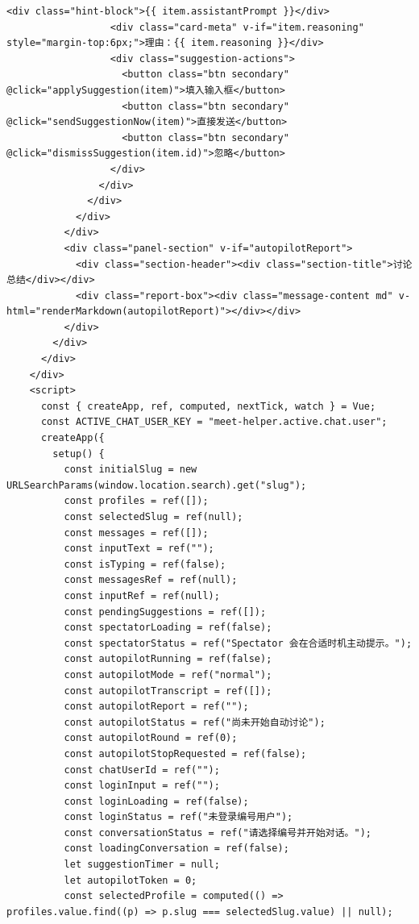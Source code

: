 \documentclass[12pt,a4paper]{article}
\begin{document}
\begin{Verbatim}[fontsize=\footnotesize]
                  <div class="hint-block">{{ item.assistantPrompt }}</div>
                  <div class="card-meta" v-if="item.reasoning" style="margin-top:6px;">理由：{{ item.reasoning }}</div>
                  <div class="suggestion-actions">
                    <button class="btn secondary" @click="applySuggestion(item)">填入输入框</button>
                    <button class="btn secondary" @click="sendSuggestionNow(item)">直接发送</button>
                    <button class="btn secondary" @click="dismissSuggestion(item.id)">忽略</button>
                  </div>
                </div>
              </div>
            </div>
          </div>
          <div class="panel-section" v-if="autopilotReport">
            <div class="section-header"><div class="section-title">讨论总结</div></div>
            <div class="report-box"><div class="message-content md" v-html="renderMarkdown(autopilotReport)"></div></div>
          </div>
        </div>
      </div>
    </div>
    <script>
      const { createApp, ref, computed, nextTick, watch } = Vue;
      const ACTIVE_CHAT_USER_KEY = "meet-helper.active.chat.user";
      createApp({
        setup() {
          const initialSlug = new URLSearchParams(window.location.search).get("slug");
          const profiles = ref([]);
          const selectedSlug = ref(null);
          const messages = ref([]);
          const inputText = ref("");
          const isTyping = ref(false);
          const messagesRef = ref(null);
          const inputRef = ref(null);
          const pendingSuggestions = ref([]);
          const spectatorLoading = ref(false);
          const spectatorStatus = ref("Spectator 会在合适时机主动提示。");
          const autopilotRunning = ref(false);
          const autopilotMode = ref("normal");
          const autopilotTranscript = ref([]);
          const autopilotReport = ref("");
          const autopilotStatus = ref("尚未开始自动讨论");
          const autopilotRound = ref(0);
          const autopilotStopRequested = ref(false);
          const chatUserId = ref("");
          const loginInput = ref("");
          const loginLoading = ref(false);
          const loginStatus = ref("未登录编号用户");
          const conversationStatus = ref("请选择编号并开始对话。");
          const loadingConversation = ref(false);
          let suggestionTimer = null;
          let autopilotToken = 0;
          const selectedProfile = computed(() => profiles.value.find((p) => p.slug === selectedSlug.value) || null);
\end{Verbatim}
\end{document}
